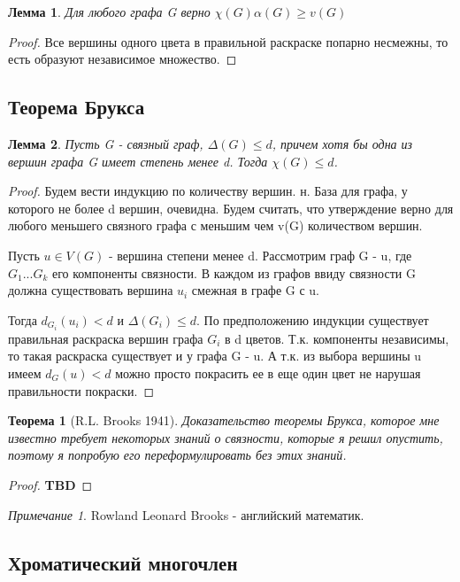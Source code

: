 \documentclass{article}
\renewcommand{\le}{\leqslant}
\renewcommand{\ge}{\geqslant}
\newtheorem{theorem}{Теорема}
\newtheorem{lemma}{Лемма}
\theoremstyle{definition}
\theoremstyle{remark}
\newtheorem*{remark}{Примечание}
\begin{document}
\begin{lemma}
    Для любого графа G верно $\chi(G)\alpha(G) \ge v(G)$  \label{lemma7}
\end{lemma}
\begin{proof}
    Все вершины одного цвета в правильной раскраске попарно несмежны, то есть образуют независимое множество.
\end{proof}

\subsection{Теорема Брукса}

\begin{lemma} \label{lemma8}
   Пусть G - связный граф, $\Delta(G) \le d$, причем хотя бы одна из
вершин графа G имеет степень менее d. Тогда $\chi(G) \le d$.
\end{lemma}
\begin{proof}
   Будем вести индукцию по количеству вершин. н. База для графа, 
у которого не более d вершин, очевидна.
Будем считать, что утверждение верно для любого меньшего
связного графа с меньшим чем v(G) количеством вершин.

Пусть $u \in V(G)$ - вершина степени менее d. Рассмотрим граф G - u, где $G_1...G_k$ его компоненты связности. В каждом из графов ввиду связности G должна существовать вершина $u_i$ смежная в графе G  с u.

Тогда $d_{G_i}(u_i) < d$ и $\Delta(G_i) \le d $. По предположению индукции существует правильная раскраска вершин графа $G_i$ в d цветов. Т.к. компоненты независимы, то такая раскраска существует и у графа G - u. А т.к. из выбора вершины u имеем $d_G(u) < d$ можно просто покрасить ее в еще один цвет не нарушая правильности покраски.
\end{proof}

\begin{theorem} [R.L. Brooks 1941]
    Доказательство теоремы Брукса, которое мне известно требует некоторых знаний о связности, которые я решил опустить, поэтому я попробую его переформулировать без этих знаний.
\end{theorem}
\begin{proof}
    \textbf{TBD}
\end{proof}

\begin{remark}
    Rowland Leonard Brooks - английский математик.
\end{remark}

\subsection{Хроматический многочлен}
\end{document}
